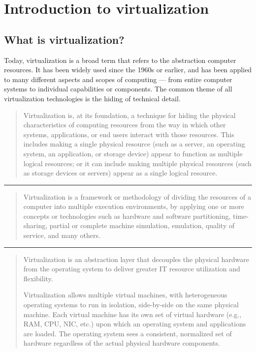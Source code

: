 \chapter{Introduction to virtualization}
\label{ch:intro:intro}


\section{What is virtualization?}
\label{sec:intro:intro:whatis}

Today, virtualization is a broad term that refers to the abstraction computer
resources. It has been widely used since the 1960s or earlier, and has been
applied to many different aspects and scopes of computing — from entire
computer systems to individual capabilities or components. The common theme of
all virtualization technologies is the hiding of technical detail.

\begin{quote}
Virtualization is, at its foundation, a technique for hiding the physical
characteristics of computing resources from the way in which other systems,
applications, or end users interact with those resources. This includes making
a single physical resource (such as a server, an operating system, an
application, or storage device) appear to function as multiple logical
resources; or it can include making multiple physical resources (such as
storage devices or servers) appear as a single logical resource.~\cite{ema101}
\end{quote}

\begin{center}
\rule{10.0em}{0.02em}
\end{center}

\begin{quote}
Virtualization is a framework or methodology of dividing the resources of a
computer into multiple execution environments, by applying one or more concepts
or technologies such as hardware and software partitioning, time-sharing,
partial or complete machine simulation, emulation, quality of service, and many
others.~\cite{singh-intro}
\end{quote}

\begin{center}
\rule{10.0em}{0.02em}
\end{center}

\begin{quote}
Virtualization is an abstraction layer that decouples the physical hardware
from the operating system to deliver greater IT resource utilization and
flexibility.

Virtualization allows multiple virtual machines, with heterogeneous operating
systems to run in isolation, side-by-side on the same physical machine. Each
virtual machine has its own set of virtual hardware (e.g., RAM, CPU, NIC, etc.)
upon which an operating system and applications are loaded. The operating
system sees a consistent, normalized set of hardware regardless of the actual
physical hardware components.~\cite{vmware-intro}
\end{quote}

